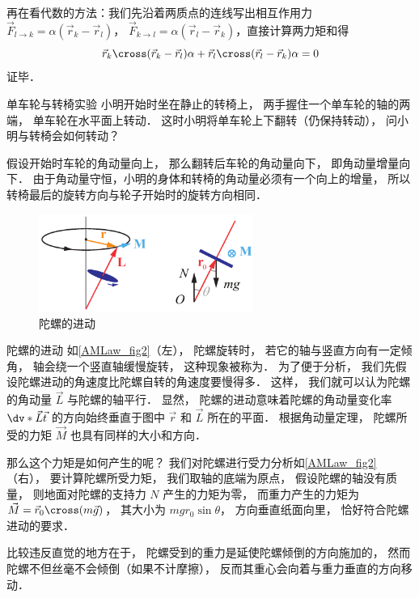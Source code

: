 再在看代数的方法：我们先沿着两质点的连线写出相互作用力 $\vec F_{l\to k} = \alpha(\vec r_k - \vec r_l)$， $\vec F_{k\to l} = \alpha(\vec r_l - \vec r_k)$，直接计算两力矩和得
\begin{equation}
\vec r_k \cross (\vec r_k - \vec r_l)\alpha + \vec r_l \cross (\vec r_l - \vec r_k)\alpha = 0
\end{equation}
证毕．

\begin{exam}{单车轮与转椅实验}
小明开始时坐在静止的转椅上， 两手握住一个单车轮的轴的两端， 单车轮在水平面上转动． 这时小明将单车轮上下翻转（仍保持转动）， 问小明与转椅会如何转动？

假设开始时车轮的角动量向上， 那么翻转后车轮的角动量向下， 即角动量增量向下． 由于角动量守恒，小明的身体和转椅的角动量必须有一个向上的增量， 所以转椅最后的旋转方向与轮子开始时的旋转方向相同．
\end{exam}

\begin{figure}[ht]
\centering
\includegraphics[width=7cm]{./figures/AMLaw2.pdf}
\caption{陀螺的进动}\label{AMLaw_fig2}
\end{figure}

\begin{exam}{陀螺的进动}\label{AMLaw_ex2}
如\autoref{AMLaw_fig2}（左）， 陀螺旋转时， 若它的轴与竖直方向有一定倾角， 轴会绕一个竖直轴缓慢旋转， 这种现象被称为． 为了便于分析， 我们先假设陀螺进动的角速度比陀螺自转的角速度要慢得多． 这样， 我们就可以认为陀螺的角动量 $\vec L$ 与陀螺的轴平行． 显然， 陀螺的进动意味着陀螺的角动量变化率 $\dv*{\vec L}{\vec t}$ 的方向始终垂直于图中 $\vec r$ 和 $\vec L$ 所在的平面． 根据角动量定理， 陀螺所受的力矩 $\vec M$ 也具有同样的大小和方向．

那么这个力矩是如何产生的呢？ 我们对陀螺进行受力分析如\autoref{AMLaw_fig2}（右）， 要计算陀螺所受力矩， 我们取轴的底端为原点， 假设陀螺的轴没有质量， 则地面对陀螺的支持力 $N$ 产生的力矩为零， 而重力产生的力矩为 $\vec M = \vec r_0 \cross (m\vec g)$， 其大小为 $mgr_0\sin\theta$， 方向垂直纸面向里， 恰好符合陀螺进动的要求．

比较违反直觉的地方在于， 陀螺受到的重力是延使陀螺倾倒的方向施加的， 然而陀螺不但丝毫不会倾倒（如果不计摩擦）， 反而其重心会向着与重力垂直的方向移动．
\end{exam}


